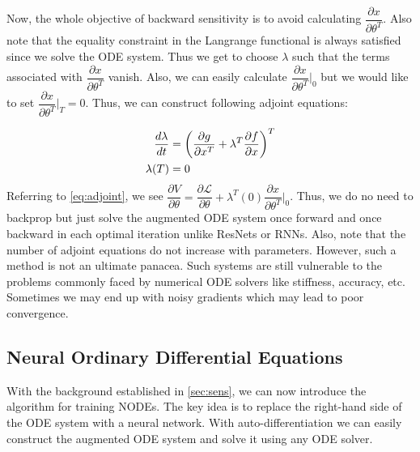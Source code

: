 \documentclass[fontsize=11pt]{article}
\theoremstyle{definition}
\begin{document}
Now, the whole objective of backward sensitivity is to avoid calculating $\dfrac{\partial x}{\partial \theta^T}$.
Also note that the equality constraint in the Langrange functional is always satisfied
since we solve the ODE system. Thus we get to choose $\lambda$ such that the terms
associated with $\dfrac{\partial x}{\partial \theta^T}$ vanish. Also, we can 
easily calculate $\dfrac{\partial x}{\partial \theta^T}|_0$ but we would like to set
$\dfrac{\partial x}{\partial \theta^T}|_T = 0$. Thus, we can construct following adjoint 
equations:

\begin{align}
    \dfrac{d\lambda}{dt} &= \left(\dfrac{\partial g}{\partial x^T} + \lambda^T \dfrac{\partial f}{\partial x}\right)^T \notag \\
    \lambda(T) &= 0
\end{align}
Referring to \cref{eq:adjoint}, we see $\dfrac{\partial V}{\partial \theta} = \dfrac{\partial \mathcal{L}}{\partial \theta} + \lambda^T(0)\dfrac{\partial x}{\partial \theta^T}|_0$.
Thus, we do no need to backprop but just solve the augmented ODE system once forward 
and once backward in each optimal iteration unlike ResNets or RNNs. Also, note that the number 
of adjoint equations do not increase with parameters. However, such a method is not 
an ultimate panacea. Such systems are still vulnerable to the problems commonly faced by
numerical ODE solvers like stiffness, accuracy, etc. Sometimes we may end up 
with noisy gradients which may lead to
poor convergence.

\subsection{Neural Ordinary Differential Equations}

With the background established in \cref{sec:sens}, we can now introduce the algorithm
for training NODEs. The key idea is to replace the right-hand side of the ODE system
with a neural network. With auto-differentiation we can easily construct the augmented
ODE system and solve it using any ODE solver. 
\end{document}
